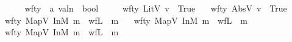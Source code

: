 \begin{isabellebody}
\isanewline
\ \ \ \ \ \ 
\isanewline\isanewline
\isamarkupfalse%
\ wf{\isacharunderscore}{\kern0pt}ty\ {\isacharcolon}{\kern0pt}{\isacharcolon}{\kern0pt}\ {\isachardoublequoteopen}{\isacharprime}{\kern0pt}a\ valn\ {\isasymRightarrow}\ bool{\isachardoublequoteclose}\ \isanewline
\ \ \ \ {\isachardoublequoteopen}wf{\isacharunderscore}{\kern0pt}ty\ {\isacharparenleft}{\kern0pt}LitV\ v{\isacharparenright}{\kern0pt}\ {\isacharequal}{\kern0pt}\ True{\isachardoublequoteclose}\isanewline
\ \ {\isacharbar}{\kern0pt}\ {\isachardoublequoteopen}wf{\isacharunderscore}{\kern0pt}ty\ {\isacharparenleft}{\kern0pt}AbsV\ v{\isacharparenright}{\kern0pt}\ {\isacharequal}{\kern0pt}\ True{\isachardoublequoteclose}\isanewline
\ \ {\isacharbar}{\kern0pt}\ {\isachardoublequoteopen}wf{\isacharunderscore}{\kern0pt}ty\ {\isacharparenleft}{\kern0pt}MapV\ {\isacharparenleft}{\kern0pt}InM{}\ m{\isacharparenright}{\kern0pt}{\isacharparenright}{\kern0pt}\ {\isacharequal}{\kern0pt}\ wf{\isacharunderscore}{\kern0pt}L\ {}\ m{\isachardoublequoteclose}\isanewline
\ \ {\isacharbar}{\kern0pt}\ {\isachardoublequoteopen}wf{\isacharunderscore}{\kern0pt}ty\ {\isacharparenleft}{\kern0pt}MapV\ {\isacharparenleft}{\kern0pt}InM{}\ m{\isacharparenright}{\kern0pt}{\isacharparenright}{\kern0pt}\ {\isacharequal}{\kern0pt}\ wf{\isacharunderscore}{\kern0pt}L\ {}\ m{\isachardoublequoteclose}\isanewline
\ \ {\isacharbar}{\kern0pt}\ {\isachardoublequoteopen}wf{\isacharunderscore}{\kern0pt}ty\ {\isacharparenleft}{\kern0pt}MapV\ {\isacharparenleft}{\kern0pt}InM{}\ m{\isacharparenright}{\kern0pt}{\isacharparenright}{\kern0pt}\ {\isacharequal}{\kern0pt}\ wf{\isacharunderscore}{\kern0pt}L\ {}\ m{\isachardoublequoteclose}\isanewline
\end{isabellebody}


